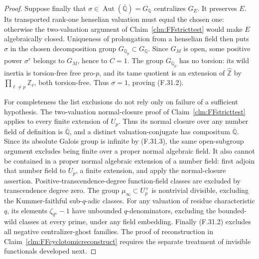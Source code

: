 \documentclass[11pt]{article}
\begin{document}
\begin{proof}
Suppose finally that
\(\sigma\in\operatorname{Aut}(\overline{\mathbb Q})
=G_{\mathbb Q}\) centralizes \(G_E\).
It preserves \(E\). Its transported rank-one
henselian valuation must equal the chosen one:
otherwise the two-valuation argument of
Claim~\ref{clm:FFstricttest} would make \(E\)
algebraically closed. Uniqueness of prolongation
from a henselian field then puts \(\sigma\)
in the chosen decomposition group
\(G_{\mathbb Q_p}\subset G_{\mathbb Q}\).
Since \(G_M\) is open, some positive power
\(\sigma^r\) belongs to \(G_M\), hence to
\(C=1\). The group \(G_{\mathbb Q_p}\) has
no torsion: its wild inertia is torsion-free
free pro-\(p\), and its tame quotient is an
extension of \(\widehat{\mathbb Z}\) by
\(\prod_{\ell\ne p}\mathbb Z_\ell\), both
torsion-free. Thus \(\sigma=1\), proving
(F.31.2).

For completeness the list exclusions do not
rely only on failure of a sufficient hypothesis.
The two-valuation normal-closure proof of
Claim~\ref{clm:FFstricttest} applies to every
finite extension of \(U_p\). Thus its normal
closure over any number field of definition
is \(\overline{\mathbb Q}\), and a distinct
valuation-conjugate has compositum
\(\overline{\mathbb Q}\). Since its absolute
Galois group is infinite by (F.31.3), the same
open-subgroup argument excludes being finite
over a proper normal algebraic field. It also
cannot be contained in a proper normal algebraic
extension of a number field: first adjoin that
number field to \(U_p\), a finite extension,
and apply the normal-closure assertion.
Positive-transcendence-degree function-field
classes are excluded by transcendence degree
zero. The group \(\mu_\infty\subset U_p^\times\)
is nontrivial divisible, excluding the
Kummer-faithful sub-\(q\)-adic classes. For
any valuation of residue characteristic \(q\),
its elements \(\zeta_{q^n}-1\) have unbounded
\(q\)-denominators, excluding the bounded-wild
classes at every prime, under any field embedding.
Finally (F.31.2) excludes all negative
centralizer-ghost families. The proof of
reconstruction in Claim~\ref{clm:FFcyclotomicreconstruct}
requires the separate treatment of invisible
functionals developed next.
\end{proof}
\end{document}
